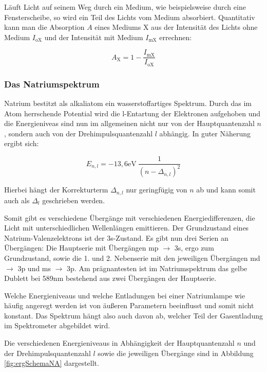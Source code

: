 \documentclass{article}
\begin{document}
Läuft Licht auf seinem Weg durch ein Medium, wie beispielsweise durch eine Fensterscheibe, so wird ein Teil des Lichts vom Medium absorbiert. Quantitativ kann man die Absorption $A$ eines Mediums X aus der Intensität des Lichts ohne Medium $I_{\text{oX}}$ und der Intensität mit Medium $I_{\text{mX}}$ errechnen:

\begin{equation}
    A_{\text{X}} = 1 - \frac{I_{\text{mX}}}{I_{\text{oX}}}
    \label{eq:absorp}
\end{equation}

\subsubsection{Das Natriumspektrum} \label{DasNatriumspektrum}

Natrium bestitzt als alkaliatom ein wasserstoffartiges Spektrum. Durch das im Atom herrschende Potential wird die l-Entartung der Elektronen aufgehoben und die Energieniveas sind nun im allgemeinen nicht nur von der Hauptquantenzahl $n$, sondern auch von der Drehimpulsquantenzahl $l$ abhängig. In guter Näherung ergibt sich:

\begin{equation}
    E_{n, l} = -13,6 \text{eV} \ \frac{1}{(n - \Delta_{n,l})^2}
    \label{eq:Energ-Na}
\end{equation}

Hierbei hängt der Korrekturterm $\Delta_{n,l}$ nur geringfügig von $n$ ab und kann somit auch als $\Delta_{l}$ geschrieben werden. 

Somit gibt es verschiedene Übergänge mit verschiedenen Energiedifferenzen, die Licht mit unterschiedlichen Wellenlängen emittieren. Der Grundzustand eines Natrium-Valenzelektrons ist der 3s-Zustand. Es gibt nun drei Serien an Übergängen: Die Hauptserie mit Übergängen mp $\xrightarrow{}$ 3s, ergo zum Grundzustand, sowie die 1. und 2. Nebenserie mit den jeweiligen Übergängen md $\xrightarrow{}$ 3p und ms $\xrightarrow{}$ 3p. Am prägnantesten ist im Natriumspektrum das gelbe Dublett bei 589nm bestehend aus zwei Übergängen der Hauptserie. 

Welche Energieniveaus und welche Entladungen bei einer Natriumlampe wie häufig angeregt werden ist von äußeren Parametern beeinflusst und somit nicht konstant. Das Spektrum hängt also auch davon ab, welcher Teil der Gasentladung im Spektrometer abgebildet wird. 

Die verschiedenen Energieniveaus in Abhängigkeit der Hauptquantenzahl $n$ und der Drehimpulsquantenzahl $l$ sowie die jeweiligen Übergänge sind in Abbildung \ref{fig:ergSchemaNA} dargestellt.
\end{document}
